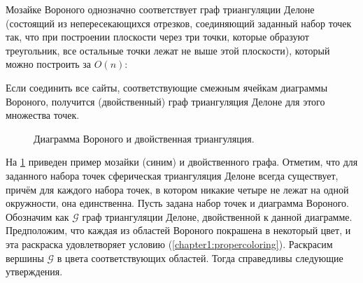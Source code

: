 Мозайке Вороного однозначно соответствует граф триангуляции Делоне (состоящий из непересекающихся отрезков, соединяющий заданный набор точек так, что при построении плоскости через три точки, которые образуют треугольник, все остальные точки лежат не выше этой плоскости), который можно построить за $O(n)$:

\begin{theorem1}
Если соединить все сайты, соответствующие смежным ячейкам диаграммы Вороного, получится (двойственный) граф триангуляция Делоне для этого множества точек.
\end{theorem1}

\begin{figure}[h]
\centering
\captionsetup{justification=centering}
\caption{Диаграмма Вороного и двойственная триангуляция.}
\label{chapter1:fig:triangexample}
\end{figure}

На \figurename{ \ref{chapter1:fig:triangexample}} приведен пример мозайки (синим) и двойственного графа.
Отметим, что для заданного набора точек сферическая триангуляция Делоне всегда существует, причём для каждого набора точек, в котором никакие четыре не лежат на одной окружности, она единственна.
Пусть задана набор точек и диаграмма Вороного. Обозначим как $\mathcal{G}$ граф триангуляции Делоне, двойственной к данной диаграмме. Предположим, что каждая из областей Вороного покрашена в некоторый цвет, и эта раскраска удовлетворяет условию 
(\ref{chapter1:propercoloring}). Раскрасим вершины $\mathcal{G}$ в цвета соответствующих областей. Тогда справедливы следующие утверждения.

